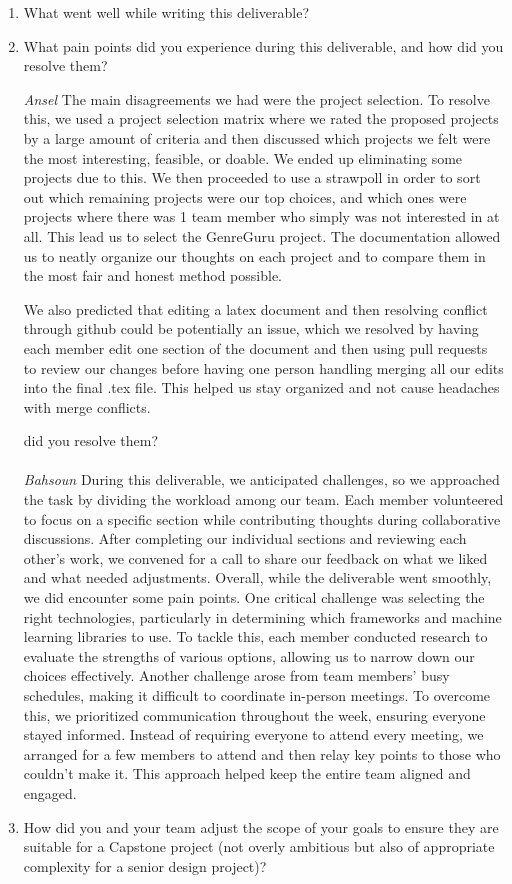 \documentclass{article}
\begin{document}
\begin{enumerate}
    \item What went well while writing this deliverable? 
    \item What pain points did you experience during this deliverable, and how
    did you resolve them?
    
\emph{Ansel}
The main disagreements we had were the project selection. To resolve this, we used a project selection matrix 
where we rated the proposed projects by a large amount of criteria and then discussed which projects we felt
were the most interesting, feasible, or doable. We ended up eliminating some projects due to this. We then proceeded to use a strawpoll in order to sort out which
remaining projects were our top choices, and which ones were projects where there was 1 team member who simply was not
interested in at all. This lead us to select the GenreGuru project. The documentation allowed us to neatly organize our
thoughts on each project and to compare them in the most fair and honest method possible. 

We also predicted that editing a latex
document and then resolving conflict through github could be potentially an issue, which we resolved by having each member 
edit one section of the document and then using pull requests to review our changes before having one person handling merging
all our edits into the final .tex file. This helped us stay organized and not cause headaches with merge conflicts. 

    did you resolve them? \\ \\
    \emph{Bahsoun}
    During this deliverable, we anticipated challenges, so we approached the task by dividing the workload among our team. Each member volunteered to focus on a specific section while contributing thoughts during collaborative discussions. After completing our individual sections and reviewing each other's work, we convened for a call to share our feedback on what we liked and what needed adjustments. Overall, while the deliverable went smoothly, we did encounter some pain points. One critical challenge was selecting the right technologies, particularly in determining which frameworks and machine learning libraries to use. To tackle this, each member conducted research to evaluate the strengths of various options, allowing us to narrow down our choices effectively. Another challenge arose from team members' busy schedules, making it difficult to coordinate in-person meetings. To overcome this, we prioritized communication throughout the week, ensuring everyone stayed informed. Instead of requiring everyone to attend every meeting, we arranged for a few members to attend and then relay key points to those who couldn't make it. This approach helped keep the entire team aligned and engaged.

    \item How did you and your team adjust the scope of your goals to ensure
    they are suitable for a Capstone project (not overly ambitious but also of
    appropriate complexity for a senior design project)?
\end{enumerate}  
\end{document}
